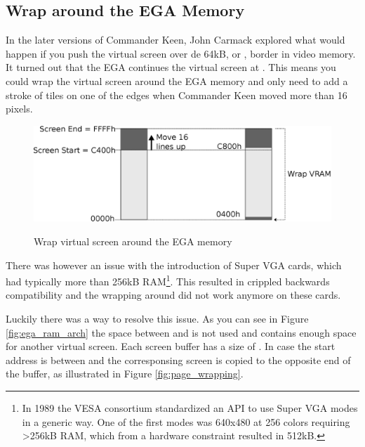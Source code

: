 \documentclass[book.tex]{subfiles}
\begin{document}
\subsection{Wrap around the EGA Memory}
In the later versions of Commander Keen, John Carmack explored what would happen if you push the virtual screen over de 64kB, or , border in video memory. It turned out that the EGA continues the virtual screen at . This means you could wrap the virtual screen around  the EGA memory and only need to add a stroke of tiles on one of the edges when Commander Keen moved more than 16 pixels.\\
\par
\begin{figure}[H]
  \centering
  \includegraphics[width=\textwidth]{imgs/drawings/ega_wrapping.eps}
  \label{fig:ega_wrapping}
  \caption{Wrap virtual screen around the EGA memory}
\end{figure}
\par
There was however an issue with the introduction of Super VGA cards, which had typically more than 256kB RAM\footnote{In 1989 the VESA consortium standardized an API to use Super VGA modes in a generic way. One of the first modes was 640x480 at 256 colors requiring >256kB RAM, which from a hardware constraint resulted in 512kB.}. This resulted in crippled backwards compatibility and the wrapping around  did not work anymore on these cards. \\
\par
Luckily there was a way to resolve this issue. As you can see in Figure \ref{fig:ega_ram_arch} the space between  and  is not used and contains enough space for another virtual screen. Each screen buffer has a size of . In case the start address is between  and  the corresponsing screen is copied to the opposite end of the buffer, as illustrated in Figure \ref{fig:page_wrapping}.\\
\par
\end{document}
